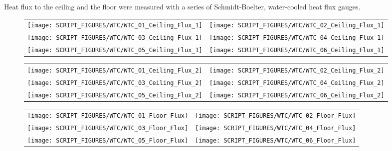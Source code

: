 \clearpage

Heat flux to the ceiling and the floor were measured with a series of Schmidt-Boelter, water-cooled heat flux gauges.
\begin{figure}[h!]
\begin{tabular*}{\textwidth}{l@{\extracolsep{\fill}}r}
\texttt{[image: SCRIPT\_FIGURES/WTC/WTC\_01\_Ceiling\_Flux\_1]} &
\texttt{[image: SCRIPT\_FIGURES/WTC/WTC\_02\_Ceiling\_Flux\_1]} \\
\texttt{[image: SCRIPT\_FIGURES/WTC/WTC\_03\_Ceiling\_Flux\_1]} &
\texttt{[image: SCRIPT\_FIGURES/WTC/WTC\_04\_Ceiling\_Flux\_1]} \\
\texttt{[image: SCRIPT\_FIGURES/WTC/WTC\_05\_Ceiling\_Flux\_1]} &
\texttt{[image: SCRIPT\_FIGURES/WTC/WTC\_06\_Ceiling\_Flux\_1]}
\end{tabular*}
\end{figure}

\begin{figure}[p]
\begin{tabular*}{\textwidth}{l@{\extracolsep{\fill}}r}
\texttt{[image: SCRIPT\_FIGURES/WTC/WTC\_01\_Ceiling\_Flux\_2]} &
\texttt{[image: SCRIPT\_FIGURES/WTC/WTC\_02\_Ceiling\_Flux\_2]} \\
\texttt{[image: SCRIPT\_FIGURES/WTC/WTC\_03\_Ceiling\_Flux\_2]} &
\texttt{[image: SCRIPT\_FIGURES/WTC/WTC\_04\_Ceiling\_Flux\_2]} \\
\texttt{[image: SCRIPT\_FIGURES/WTC/WTC\_05\_Ceiling\_Flux\_2]} &
\texttt{[image: SCRIPT\_FIGURES/WTC/WTC\_06\_Ceiling\_Flux\_2]}
\end{tabular*}
\end{figure}

\begin{figure}[p]
\begin{tabular*}{\textwidth}{l@{\extracolsep{\fill}}r}
\texttt{[image: SCRIPT\_FIGURES/WTC/WTC\_01\_Floor\_Flux]} &
\texttt{[image: SCRIPT\_FIGURES/WTC/WTC\_02\_Floor\_Flux]} \\
\texttt{[image: SCRIPT\_FIGURES/WTC/WTC\_03\_Floor\_Flux]} &
\texttt{[image: SCRIPT\_FIGURES/WTC/WTC\_04\_Floor\_Flux]} \\
\texttt{[image: SCRIPT\_FIGURES/WTC/WTC\_05\_Floor\_Flux]} &
\texttt{[image: SCRIPT\_FIGURES/WTC/WTC\_06\_Floor\_Flux]}
\end{tabular*}
\end{figure}

